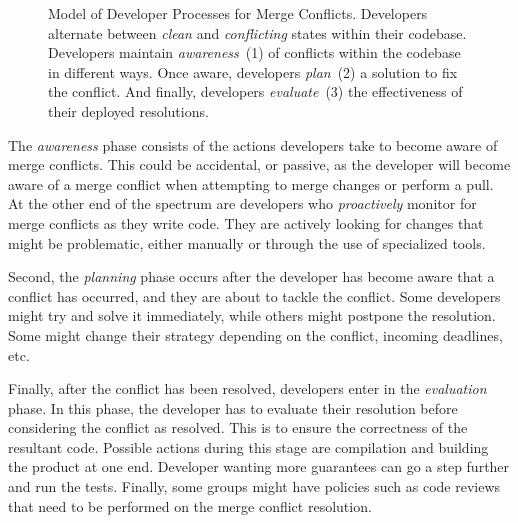 \begin{figure}[!htbp]
\centering
{}
\caption{Model of Developer Processes for Merge Conflicts. Developers alternate between \textit{clean} and \textit{conflicting} states within their codebase. Developers maintain \textit{awareness}~(1) of conflicts within the codebase in different ways. Once aware, developers \textit{plan}~(2) a solution to fix the conflict. And finally, developers \textit{evaluate}~(3) the effectiveness of their deployed resolutions.}
\label{model}
\end{figure}

The \emph{awareness} phase consists of the actions developers take to become aware of merge conflicts.
This could be accidental, or passive, as the developer will become aware of a merge conflict when attempting to merge changes or perform a pull.
At the other end of the spectrum are developers who \emph{proactively} monitor for merge conflicts as they write code.
They are actively looking for changes that might be problematic, either manually or through the use of specialized tools.

Second, the \emph{planning} phase occurs after the developer has become aware that a conflict has occurred, and they are about to tackle the conflict.
Some developers might try and solve it immediately, while others might postpone the resolution.
Some might change their strategy depending on the conflict, incoming deadlines, etc.

Finally, after the conflict has been resolved, developers enter in the \emph{evaluation} phase.
In this phase, the developer has to evaluate their resolution before considering the conflict as resolved.
This is to ensure the correctness of the resultant code.
Possible actions during this stage are compilation and building the product at one end.
Developer wanting more guarantees can go a step further and run the tests.
Finally, some groups might have policies such as code reviews that need to be performed on the merge conflict resolution.
 
